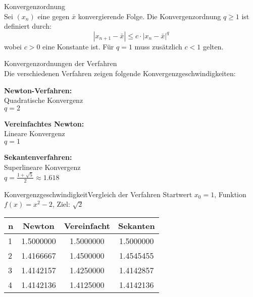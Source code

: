 \begin{definition}{Konvergenzordnung}\\
Sei $(x_n)$ eine gegen $\bar{x}$ konvergierende Folge. Die Konvergenzordnung $q \geq 1$ ist definiert durch:
$$|x_{n+1}-\bar{x}| \leq c \cdot |x_n-\bar{x}|^q$$
wobei $c > 0$ eine Konstante ist. Für $q = 1$ muss zusätzlich $c < 1$ gelten.
\end{definition}

\begin{theorem}{Konvergenzordnungen der Verfahren}\\
Die verschiedenen Verfahren zeigen folgende Konvergenzgeschwindigkeiten:
\vspace{1mm}\\
\begin{minipage}[t]{0.3\textwidth}
    \textbf{Newton-Verfahren:}\\
    Quadratische Konvergenz\\
    $q = 2$
\end{minipage}
\hspace{2mm}
\begin{minipage}[t]{0.3\textwidth}
    \textbf{Vereinfachtes Newton:}\\
    Lineare Konvergenz\\
    $q = 1$
\end{minipage}
\hspace{2mm}
\begin{minipage}[t]{0.3\textwidth}
    \textbf{Sekantenverfahren:}\\
    Superlineare Konvergenz\\
    $q = \frac{1+\sqrt{5}}{2} \approx 1.618$
\end{minipage}
\end{theorem}

\begin{example2}{Konvergenzgeschwindigkeit}{Vergleich der Verfahren}
Startwert $x_0 = 1$, Funktion $f(x) = x^2 - 2$, Ziel: $\sqrt{2}$
\begin{center}
\begin{tabular}{l|c|c|c}
n & Newton & Vereinfacht & Sekanten \\\hline
1 & 1.5000000 & 1.5000000 & 1.5000000\\
2 & 1.4166667 & 1.4500000 & 1.4545455\\
3 & 1.4142157 & 1.4250000 & 1.4142857\\
4 & 1.4142136 & 1.4125000 & 1.4142136
\end{tabular}
\end{center}
\end{example2}

